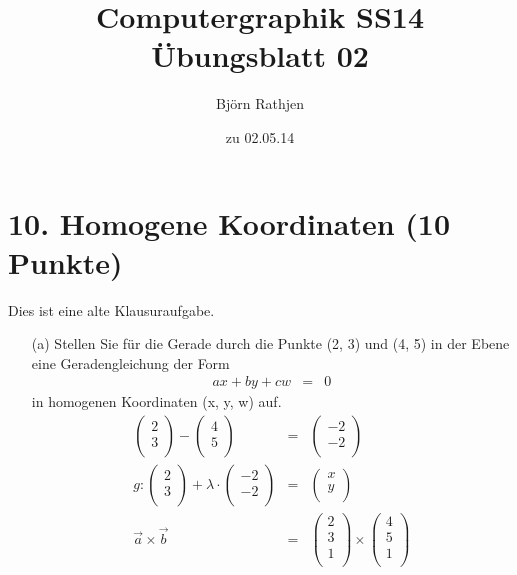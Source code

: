 \documentclass[11pt]{article}
\title{Computergraphik SS14\\Übungsblatt 02}
\author{Björn Rathjen}
\date{zu 02.05.14}
\begin{document}
\maketitle
\newpage

\section*{10. Homogene Koordinaten (10 Punkte)}
Dies ist eine alte Klausuraufgabe.
\begin{enumerate}
\item[(a)] Stellen Sie für die Gerade durch die Punkte (2, 3) und (4, 5) in der Ebene eine Geradengleichung der Form
\begin{eqnarray*}
ax + by + cw &=& 0 
\end{eqnarray*}
in homogenen Koordinaten (x, y, w) auf.
\begin{eqnarray*}
\begin{pmatrix}
2 \\ 3\\
\end{pmatrix}
-
\begin{pmatrix}
4 \\ 5 \\
\end{pmatrix}
&=&
\begin{pmatrix}
-2 \\ -2 \\
\end{pmatrix}\\
g : \begin{pmatrix}
2 \\ 3 \\
\end{pmatrix}
+
\lambda \cdot \begin{pmatrix}
-2 \\ -2 \\
\end{pmatrix} &=& \begin{pmatrix}
x \\ y \\
\end{pmatrix}\\
\vec{a} \times \vec{b} &=& \begin{pmatrix} 2\\ 3\\ 1\\
\end{pmatrix} \times \begin{pmatrix}
4 \\ 5 \\ 1 \\

\end{pmatrix}
\end{eqnarray*}
\end{enumerate}
\end{document}
